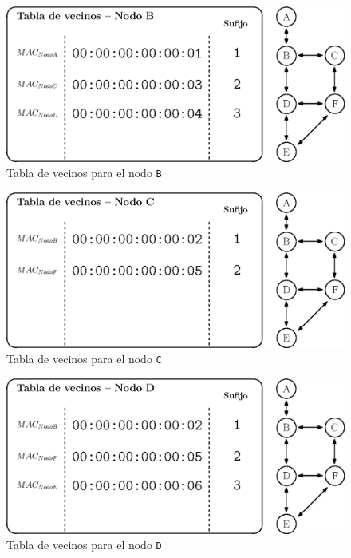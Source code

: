 \begin{figure}[ht!]
    \centering
    \includegraphics[width=\textwidth]{archivos/img/dev/topo_hello_nodoB_nb.eps}
    \caption{Tabla de vecinos para el nodo \texttt{B}}
    \label{fig:topo_hello_nodoB_nb}
\end{figure}

\begin{figure}[ht!]
    \centering
    \includegraphics[width=\textwidth]{archivos/img/dev/topo_hello_nodoC_nb.eps}
    \caption{Tabla de vecinos para el nodo \texttt{C}}
    \label{fig:topo_hello_nodoC_nb}
\end{figure}


\begin{figure}[ht!]
    \centering
    \includegraphics[width=\textwidth]{archivos/img/dev/topo_hello_nodoD_nb.eps}
    \caption{Tabla de vecinos para el nodo \texttt{D}}
    \label{fig:topo_hello_nodoD_nb}
\end{figure}


